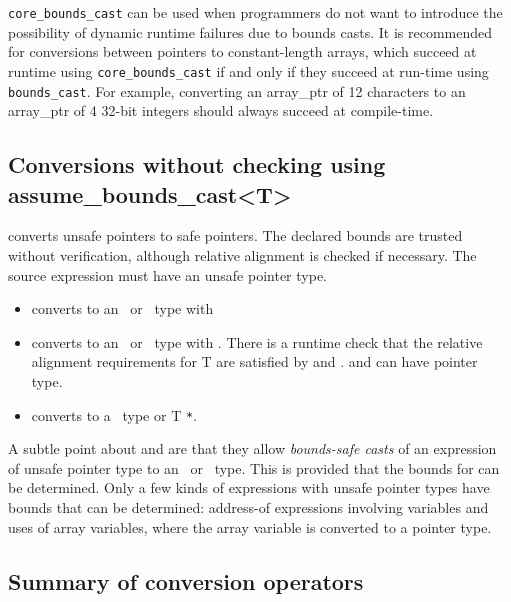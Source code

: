 \texttt{core\_bounds\_cast} can be used when programmers do not want to
introduce the possibility of dynamic runtime failures due to bounds
casts. It is recommended for conversions between pointers to
constant-length arrays, which succeed at runtime using
\texttt{core\_bounds\_cast} if and only if they succeed at run-time
using \texttt{bounds\_cast}. For example, converting an array\_ptr of 12
characters to an array\_ptr of 4 32-bit integers should always succeed
at compile-time.

\subsection{Conversions without checking using assume\_bounds\_cast\textless{}T\textgreater{}}

converts unsafe pointers to safe pointers. The declared bounds are
trusted without verification, although relative alignment is checked if
necessary. The source expression must have an unsafe pointer type.

\begin{itemize}
\item
  converts  to an \arrayptr\ or
  \arrayview\ type with 
\item
  converts  to an
  \arrayptr\ or \arrayview\ type with .
  There is a runtime check that the relative alignment requirements for
  T are satisfied by   and .  and
   can have pointer type.
\item
  converts  to a \ptr\ type or T \texttt{*}.
\end{itemize}

A subtle point about
 and
are that they allow {\em bounds-safe casts} of an expression
 of unsafe pointer type to an \arrayview\ or
\arrayptr\ type. This is provided that the bounds for 
can be determined. Only a few kinds of expressions with unsafe pointer
types have bounds that can be determined: address-of expressions
involving variables and uses of array variables, where the array
variable is converted to a pointer type.

\subsection{Summary of conversion operators}

